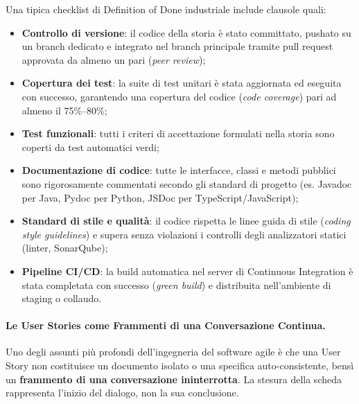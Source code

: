 \documentclass[12pt]{extarticle}
\begin{document}
\noindent Una tipica checklist di Definition of Done industriale include clausole quali:
\begin{itemize}
    \item \textbf{Controllo di versione}: il codice della storia è stato committato, pushato su un branch dedicato e integrato nel branch principale tramite pull request approvata da almeno un pari (\textit{peer review});
    \item \textbf{Copertura dei test}: la suite di test unitari è stata aggiornata ed eseguita con successo, garantendo una copertura del codice (\textit{code coverage}) pari ad almeno il 75\%--80\%;
    \item \textbf{Test funzionali}: tutti i criteri di accettazione formulati nella storia sono coperti da test automatici verdi;
    \item \textbf{Documentazione di codice}: tutte le interfacce, classi e metodi pubblici sono rigorosamente commentati secondo gli standard di progetto (es. Javadoc per Java, Pydoc per Python, JSDoc per TypeScript/JavaScript);
    \item \textbf{Standard di stile e qualità}: il codice rispetta le linee guida di stile (\textit{coding style guidelines}) e supera senza violazioni i controlli degli analizzatori statici (linter, SonarQube);
    \item \textbf{Pipeline CI/CD}: la build automatica nel server di Continuous Integration è stata completata con successo (\textit{green build}) e distribuita nell'ambiente di staging o collaudo.
\end{itemize}

\paragraph{Le User Stories come Frammenti di una Conversazione Continua.}
Uno degli assunti più profondi dell'ingegneria del software agile è che una User Story non costituisce un documento isolato o una specifica auto-consistente, bensì un \textbf{frammento di una conversazione ininterrotta}. La stesura della scheda rappresenta l'inizio del dialogo, non la sua conclusione.
\end{document}
